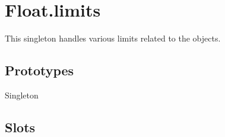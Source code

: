 
\section{Float.limits}
\label{sec:float-limits}

This singleton handles various limits related to the 
objects.

\subsection{Prototypes}
\begin{refObjects}
\item[Singleton]
\end{refObjects}

\subsection{Slots}

